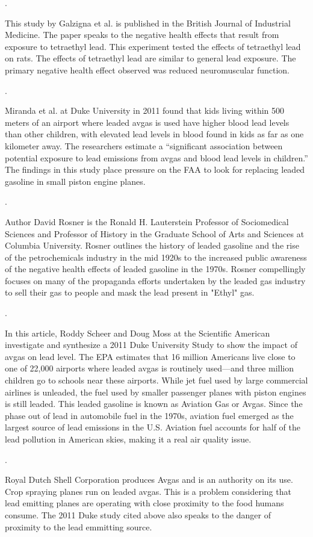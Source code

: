 \documentclass{article}\usepackage[]{graphicx}\usepackage[]{color}
\begin{document}
\bigskip
\noindent {} .

This study by Galzigna et al. is published in the British Journal of Industrial Medicine. The paper speaks to the negative health effects that result from exposure to tetraethyl lead. This experiment tested the effects of tetraethyl lead on rats. The effects of tetraethyl lead are similar to general lead exposure. The primary negative health effect observed was reduced neuromuscular function.  

\bigskip


\noindent {} .

Miranda et al. at Duke University in 2011 found that kids living within 500 meters of an airport where leaded avgas is used have higher blood lead levels than other children, with elevated lead levels in blood found in kids as far as one kilometer away. The researchers estimate a “significant association between potential exposure to lead emissions from avgas and blood lead levels in children.” The findings in this study place pressure on the FAA to look for replacing leaded gasoline in small piston engine planes. 

\bigskip

\noindent {} .

Author David Rosner is the Ronald H. Lauterstein Professor of Sociomedical Sciences and Professor of History in the Graduate School of Arts and Sciences at Columbia University. Rosner outlines the history of leaded gasoline and the rise of the petrochemicals industry in the mid 1920s to the increased public awareness of the negative health effects of leaded gasoline in the 1970s. Rosner compellingly focuses on many of the propaganda efforts undertaken by the leaded gas industry to sell their gas to people and mask the lead present in "Ethyl" gas. 

\bigskip

\noindent {} .

In this article, Roddy Scheer and Doug Moss at the Scientific American investigate and synthesize a 2011 Duke University Study to show the impact of avgas on lead level. The EPA estimates that 16 million Americans live close to one of 22,000 airports where leaded avgas is routinely used—and three million children go to schools near these airports. While jet fuel used by large commercial airlines is unleaded, the fuel used by smaller passenger planes with piston engines is still leaded. This leaded gasoline is known as Aviation Gas or Avgas. Since the phase out of lead in automobile fuel in the 1970s, aviation fuel emerged as the largest source of lead emissions in the U.S. Aviation fuel accounts for half of the lead pollution in American skies, making it a real air quality issue. 


\bigskip

\noindent {} .

Royal Dutch Shell Corporation produces Avgas and is an authority on its use. Crop spraying planes run on leaded avgas. This is a problem considering that lead emitting planes are operating with close proximity to the food humans consume. The 2011 Duke study cited above also speaks to the danger of proximity to the lead emmitting source.
\bigskip
\end{document}
